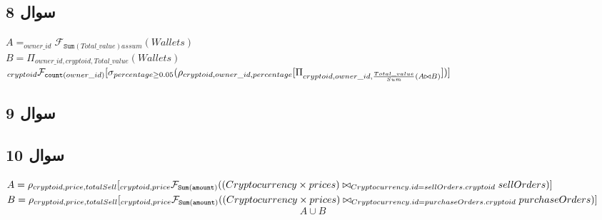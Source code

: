 \documentclass{book}
\begin{document}
        \subsection{سوال 8}

        \begin{latin}
            $A = _{owner\_id} \mathcal{F}_{\mathtt{Sum}(Total\_value) as sum} (Wallets)$\\
            $B = \Pi_{owner\_id, cryptoid, Total\_value} (Wallets)$\\
            $_{cryptoid}\mathcal{F}_{\mathtt{count}(owner\_id)} [\sigma_{percentage \geq 0.05} (\rho_{cryptoid, owner\_id, percentage}[\\\Pi_{cryptoid, owner\_id, \frac{Total\_value}{Sum}(A\bowtie B)}])]$
        \end{latin}


        \subsection{سوال 9}


        \subsection{سوال 10}
        $A = \rho_{cryptoid, price, totalSell} [_{cryptoid, price}\mathcal{F}_{\mathtt{Sum(amount)}}((Cryptocurrency \times prices) \\\bowtie_{Cryptocurrency.id = sellOrders.cryptoid} sellOrders)]$\\
        $B = \rho_{cryptoid, price, totalSell} [_{cryptoid, price}\mathcal{F}_{\mathtt{Sum(amount)}}((Cryptocurrency \times prices) \\\bowtie_{Cryptocurrency.id = purchaseOrders.cryptoid} purchaseOrders)]$\\
        $$A \cup B$$
\end{document}

